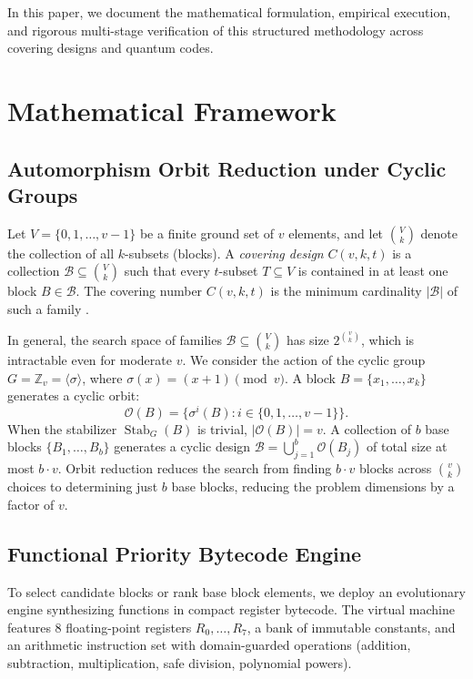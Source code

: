 \documentclass[11pt,a4paper]{article}
\begin{document}
In this paper, we document the mathematical formulation, empirical execution, and rigorous multi-stage verification of this structured methodology across covering designs and quantum codes.

\section{Mathematical Framework}
\label{sec:framework}

\subsection{Automorphism Orbit Reduction under Cyclic Groups}
\label{sec:orbits}
Let $V = \{0, 1, \dots, v-1\}$ be a finite ground set of $v$ elements, and let $\binom{V}{k}$ denote the collection of all $k$-subsets (blocks). A \emph{covering design} $C(v, k, t)$ is a collection $\mathcal{B} \subseteq \binom{V}{k}$ such that every $t$-subset $T \subseteq V$ is contained in at least one block $B \in \mathcal{B}$. The covering number $C(v, k, t)$ is the minimum cardinality $|\mathcal{B}|$ of such a family \cite{gordon2026ljcr}.

In general, the search space of families $\mathcal{B} \subseteq \binom{V}{k}$ has size $2^{\binom{v}{k}}$, which is intractable even for moderate $v$. We consider the action of the cyclic group $G = \mathbb{Z}_v = \langle \sigma \rangle$, where $\sigma(x) = (x + 1) \pmod v$. A block $B = \{x_1, \dots, x_k\}$ generates a cyclic orbit:
\begin{equation}
\label{eq:orbit}
\mathcal{O}(B) = \{ \sigma^i(B) : i \in \{0, 1, \dots, v-1\} \}.
\end{equation}
When the stabilizer $\operatorname{Stab}_G(B)$ is trivial, $|\mathcal{O}(B)| = v$. A collection of $b$ base blocks $\{B_1, \dots, B_b\}$ generates a cyclic design $\mathcal{B} = \bigcup_{j=1}^b \mathcal{O}(B_j)$ of total size at most $b \cdot v$. Orbit reduction reduces the search from finding $b \cdot v$ blocks across $\binom{v}{k}$ choices to determining just $b$ base blocks, reducing the problem dimensions by a factor of $v$.

\subsection{Functional Priority Bytecode Engine}
\label{sec:bytecode}
To select candidate blocks or rank base block elements, we deploy an evolutionary engine synthesizing functions in compact register bytecode. The virtual machine features 8 floating-point registers $R_0, \dots, R_7$, a bank of immutable constants, and an arithmetic instruction set with domain-guarded operations (addition, subtraction, multiplication, safe division, polynomial powers).
\end{document}
